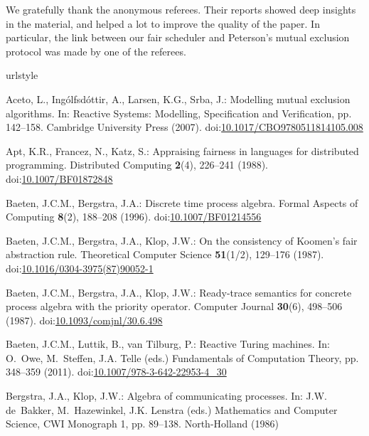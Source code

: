 \documentclass[smallcondensed]{svjour3}
\providecommand{\urlalt}[2]{\href{#1}{#2}}
\providecommand{\doi}[1]{doi:\urlalt{http://dx.doi.org/#1}{#1}}
\newcounter {part}
\begin{document}
 \begin{acknowledgements}
We gratefully thank the anonymous referees. Their reports showed deep insights in the
material, and helped a lot to improve the quality of the paper. In particular, the link between our fair
scheduler and Peterson's mutual exclusion protocol was made by one of the referees.
 \end{acknowledgements}

\newcommand{\Ruediger}{-R.}
\def\SSort#1{}\def\NSort#1{}
\begin{thebibliography}{10}
\providecommand{\url}[1]{{#1}}
\providecommand{\urlprefix}{URL }
\expandafter\ifx\csname urlstyle\endcsname\relax
  \providecommand{\doi}[1]{DOI~\discretionary{}{}{}#1}\else
  \providecommand{\doi}{DOI~\discretionary{}{}{}\begingroup
  \urlstyle{rm}\Url}\fi

Aceto, L., Ing\'{o}lfsd\'{o}ttir, A., Larsen, K.G., Srba, J.: Modelling mutual
  exclusion algorithms.
\newblock In: Reactive Systems: Modelling, Specification and Verification, pp.
  142--158. Cambridge University Press (2007).
\newblock \doi{10.1017/CBO9780511814105.008}

Apt, K.R., Francez, N., Katz, S.: Appraising fairness in languages for
  distributed programming.
\newblock Distributed Computing \textbf{2}(4), 226--241 (1988).
\newblock \doi{10.1007/BF01872848}

Baeten, J.C.M., Bergstra, J.A.: Discrete time process algebra.
\newblock Formal Aspects of Computing \textbf{8}(2), 188--208 (1996).
\newblock \doi{10.1007/BF01214556}

Baeten, J.C.M., Bergstra, J.A., Klop, J.W.: On the consistency of {Koomen's}
  fair abstraction rule.
\newblock Theoretical Computer Science \textbf{51}(1/2), 129--176 (1987).
\newblock \doi{10.1016/0304-3975(87)90052-1}

Baeten, J.C.M., Bergstra, J.A., Klop, J.W.: Ready-trace semantics for concrete
  process algebra with the priority operator.
\newblock Computer Journal \textbf{30}(6), 498--506 (1987).
\newblock \doi{10.1093/comjnl/30.6.498}

Baeten, J.C.M., Luttik, B., van Tilburg, P.: Reactive {Turing} machines.
\newblock In: O.~Owe, M.~Steffen, J.A. Telle (eds.) Fundamentals of Computation
  Theory, pp. 348--359 (2011).
\newblock \doi{10.1007/978-3-642-22953-4\_30}

Bergstra, J.A., Klop, J.W.: Algebra of communicating processes.
\newblock In: J.W. de~Bakker, M.~Hazewinkel, J.K. Lenstra (eds.) Mathematics
  and Computer Science, CWI Monograph 1, pp. 89--138. North-Holland (1986)


\end{thebibliography}
\end{document}

